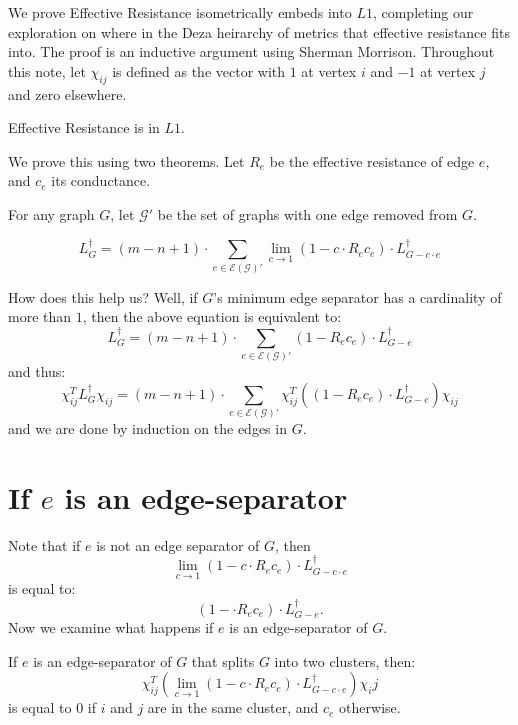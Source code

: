 

We prove Effective Resistance isometrically embeds into $L1$, completing
our exploration on where in the Deza heirarchy of metrics that effective
resistance fits into. The proof is an inductive argument using Sherman
Morrison.
Throughout this note, let $\chi_{ij}$ is defined as
the vector with $1$ at vertex $i$ and $-1$ at vertex $j$ and zero
elsewhere.

\begin{theorem} Effective Resistance is in $L1$. \end{theorem}

We prove this using two theorems. Let $R_e$ be the effective resistance
of edge $e$, and $c_e$ its conductance.

\begin{theorem}
For any graph $G$,
let $\mathcal{G}'$ be the set of graphs with one edge removed from
$G$. 

\[ L_G^\dag = (m-n+1) \cdot 
\sum_{e \in \mathcal{E(G)}'}
\lim_{c \rightarrow 1}
(1-c \cdot R_ec_e) \cdot L_{G
- c \cdot e}^\dag \]
\end{theorem}
How does this help us? Well, if $G$'s minimum edge separator has a
cardinality of more than $1$, then the
above equation is equivalent to:
\[
  L_G^\dag = (m-n+1) \cdot 
\sum_{e \in \mathcal{E(G)}'}
(1- R_ec_e) \cdot L_{G
- e}^\dag
\]
and thus:
\[ \chi_{ij}^T L_G^\dag \chi_{ij} =
(m-n+1) \cdot 
\sum_{e \in \mathcal{E(G)}'}
\chi_{ij}^T\left(
(1- R_ec_e) \cdot L_{G
- e}^\dag \right) \chi_{ij} \]
and we are done by induction on the edges in $G$.

\section{If $e$ is an edge-separator}

Note that if $e$ is not an edge separator of $G$, then
\[
\lim_{c \rightarrow 1}
(1-c \cdot R_ec_e) \cdot L_{G
- c \cdot e}^\dag
\]
is equal to:
\[
(1- \cdot R_ec_e) \cdot L_{G - e}^\dag.
\]
Now we examine what happens if $e$ is an edge-separator of $G$.

\begin{theorem}
If $e$ is an edge-separator of $G$ that splits $G$ into two clusters,
then:
\[
\chi_{ij}^T \left(\lim_{c \rightarrow 1}
(1-c \cdot R_ec_e) \cdot L_{G
- c \cdot e}^\dag\right) \chi_ij
\]
is equal to $0$ if $i$ and $j$ are in the same cluster, and $c_e$
otherwise.
\end{theorem}


